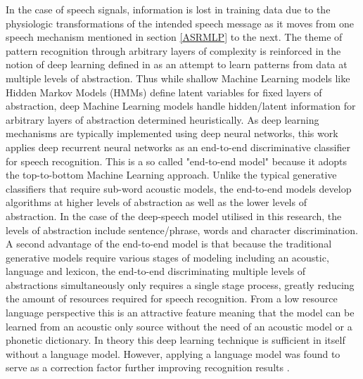  In the case of speech signals, information is lost in training data due to the physiologic transformations of the intended speech message as it moves from one speech mechanism mentioned in section \ref{ASRMLP} to the next.  The theme of pattern recognition through arbitrary layers of complexity is reinforced in the notion of deep learning defined in \cite{deng2014deep} as an attempt to learn patterns from data at multiple levels of abstraction. Thus while shallow Machine Learning models like Hidden Markov Models (HMMs) define latent variables for fixed layers of abstraction, deep Machine Learning models handle hidden/latent information for arbitrary layers of abstraction determined heuristically.  As deep learning mechanisms are typically implemented using deep neural networks, this work applies deep recurrent neural networks as an end-to-end discriminative classifier for speech recognition.  This is a so called "end-to-end model" because it adopts the top-to-bottom Machine Learning approach. Unlike the typical generative classifiers that require sub-word acoustic models, the end-to-end models develop algorithms at higher levels of abstraction as well as the lower levels of abstraction.  In the case of the deep-speech model \citep{hannun2014first} utilised in this research, the levels of abstraction include sentence/phrase, words and character discrimination. A second advantage of the end-to-end model is that because the traditional generative models require various stages of modeling including an acoustic, language and lexicon, the end-to-end discriminating multiple levels of abstractions simultaneously only requires a single stage process, greatly reducing the amount of resources required for speech recognition.  From a low resource language perspective this is an attractive feature meaning that the model can be learned from an acoustic only source without the need of an acoustic model or a phonetic dictionary.  In theory this deep learning technique is sufficient in itself without a language model.  However, applying a language model was found to serve as a correction factor further improving recognition results \citep{hannun2014deep}. 

